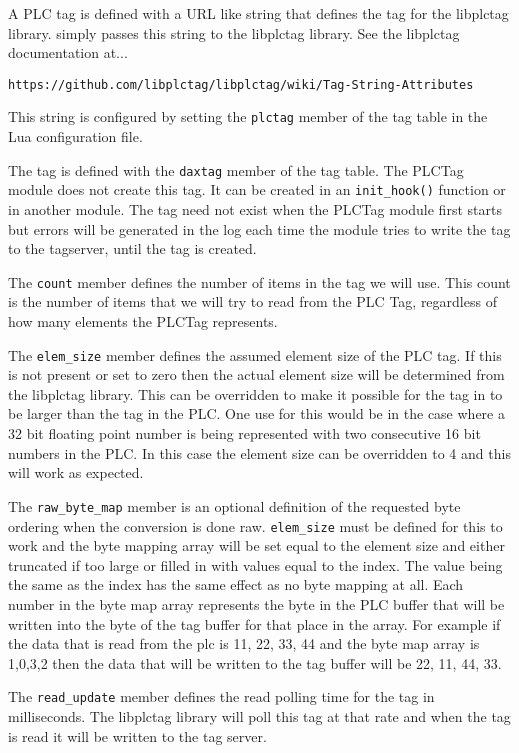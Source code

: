 A PLC tag is defined with a URL like string that defines the tag
for the libplctag library.  \opendax{} simply passes this string to
the libplctag library.  See the libplctag documentation at...

\texttt{https://github.com/libplctag/libplctag/wiki/Tag-String-Attributes}

This string is configured by setting the \texttt{plctag}
member of the tag table in the Lua configuration file.

The \opendax{} tag is defined with the \texttt{daxtag} member of the
tag table.  The PLCTag module does not create this tag.  It can
be created in an \texttt{init\_hook()} function or in another module.
The tag need not exist when the PLCTag module first starts but errors
will be generated in the log each time the module tries to write the
tag to the tagserver, until the tag is created.

The \texttt{count} member defines the number of items in the \opendax
tag we will use.  This count is the number of items that we will try
to read from the PLC Tag, regardless of how many elements the PLCTag
represents.

The \texttt{elem\_size} member defines the assumed element size of
the PLC tag.  If this is not present or set to zero then the actual
element size will be determined from the libplctag library.  This 
can be overridden to make it possible for the tag in \opendax{} to be
larger than the tag in the PLC.  One use for this would be in the case
where a 32 bit floating point number is being represented with two
consecutive 16 bit numbers in the PLC.  In this case the element size
can be overridden to 4 and this will work as expected.

The \texttt{raw\_byte\_map} member is an optional definition
of the requested byte ordering when the conversion is done raw.
\texttt{elem\_size} must be defined for this to work and the byte mapping
array will be set equal to the element size and either truncated if too
large or filled in with values equal to the index.  The value being 
the same as the index has the same effect as no byte mapping at all.
Each number in the byte map array represents the byte in the PLC buffer
that will be written into the byte of the \opendax{} tag buffer for
that place in the array.  For example if the data that is read from the plc
is 11, 22, 33, 44 and the byte map array is {1,0,3,2} then the data that
will be written to the \opendax{} tag buffer will be 22, 11, 44, 33.

The \texttt{read\_update} member defines the read polling time
for the tag in milliseconds.  The libplctag library will poll this
tag at that rate and when the tag is read it will be written to the
\opendax{} tag server.

